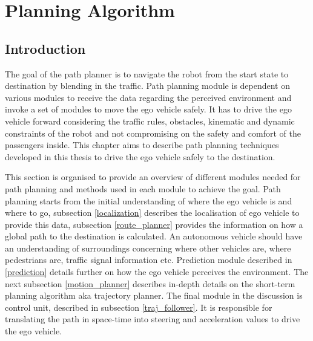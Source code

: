 \chapter{Planning Algorithm}
\label{planning_algo}
\section{Introduction}

The goal of the path planner is to navigate the robot from the start state to destination by blending in the traffic. Path planning module is dependent on various modules to receive the data regarding the perceived environment and invoke a set of modules to move the ego vehicle safely. It has to drive the ego vehicle forward considering the traffic rules, obstacles, kinematic and dynamic constraints of the robot and not compromising on the safety and comfort of the passengers inside. This chapter aims to describe path planning techniques developed in this thesis to drive the ego vehicle safely to the destination.

This section is organised to provide an overview of different modules needed for path planning and methods used in each module to achieve the goal. Path planning starts from the initial understanding of where the ego vehicle is and where to go, subsection \ref{localization} describes the localisation of ego vehicle to provide this data, subsection \ref{route_planner} provides the information on how a global path to the destination is calculated. An autonomous vehicle should have an understanding of surroundings concerning where other vehicles are, where pedestrians are, traffic signal information etc. Prediction module described in \ref{prediction} details further on how the ego vehicle perceives the environment. The next subsection \ref{motion_planner} describes in-depth details on the short-term planning algorithm aka trajectory planner. The final module in the discussion is control unit, described in subsection \ref{traj_follower}. It is responsible for translating the path in space-time into steering and acceleration values to drive the ego vehicle.

